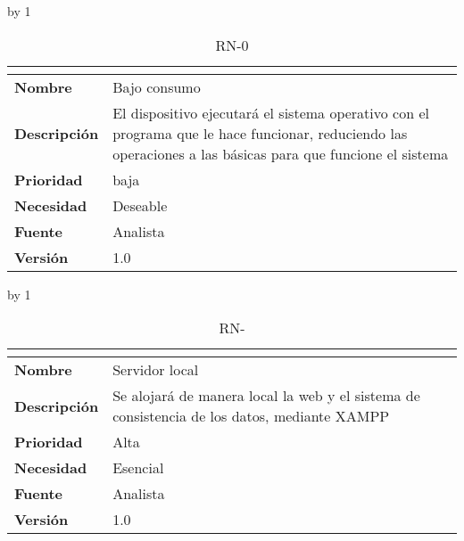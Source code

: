 \advance\rn by 1
\begin{table}[H]
	\caption{RN-0\number\rn}
	\begin{tabular}{|l|p{}|}
		\hline
		\multicolumn{2}{|c|}{\cellcolor[HTML]{BFBFBF}{\color[HTML]{000000} \textbf{RN-0\number\rn}}} \\ \hline
		\textbf{Nombre}      & Bajo consumo                                                                                                                                               \\ \hline
		\textbf{Descripción} & El dispositivo ejecutará el sistema operativo con el programa que le hace funcionar, reduciendo las operaciones a las básicas para que funcione el sistema \\ \hline
		\textbf{Prioridad}   & baja                                                                                                                                                       \\ \hline
		\textbf{Necesidad}   & Deseable                                                                                                                                                   \\ \hline
		\textbf{Fuente}      & Analista                                                                                                                                                   \\ \hline
		\textbf{Versión}     & 1.0                                                                                                                                                        \\ \hline
	\end{tabular}
\end{table}
\advance\rn by 1
\begin{table}[H]
	\caption{RN-\number\rn}
	\begin{tabular}{|l|p{}|}
		\hline
		\multicolumn{2}{|c|}{\cellcolor[HTML]{BFBFBF}{\color[HTML]{000000} \textbf{RN-\number\rn}}} \\ \hline
		\textbf{Nombre}      & Servidor local                                                                               \\ \hline
		\textbf{Descripción} & Se alojará de manera local la web y  el sistema de consistencia de los datos, mediante XAMPP \\ \hline
		\textbf{Prioridad}   & Alta                                                                                         \\ \hline
		\textbf{Necesidad}   & Esencial                                                                                     \\ \hline
		\textbf{Fuente}      & Analista                                                                                     \\ \hline
		\textbf{Versión}     & 1.0                                                                                          \\ \hline
	\end{tabular}
\end{table}

